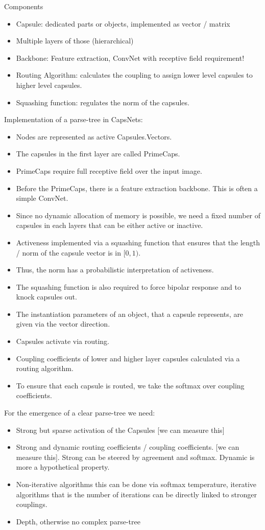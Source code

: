 \documentclass{article}
\begin{document}
Components
\begin{itemize}
	\item Capsule: dedicated parts or objects, implemented as vector / matrix
	\item Multiple layers of those (hierarchical)
	\item Backbone: Feature extraction, ConvNet with receptive field requirement!
	\item Routing Algorithm: calculates the coupling to assign lower level capsules to higher level capsules.
	\item Squashing function: regulates the norm of the capsules.
\end{itemize}

Implementation of a parse-tree in CapsNets:
\begin{itemize}
	\item Nodes are represented as active Capsules.Vectors.
	\item The capsules in the first layer are called PrimeCaps.
	\item PrimeCaps require full receptive field over the input image.
	\item Before the PrimeCaps, there is a feature extraction backbone. This is often a simple ConvNet.
	\item Since no dynamic allocation of memory is possible, we need a fixed number of capsules in each layers that can be either active or inactive.
	\item Activeness implemented via a squashing function that ensures that the length / norm of the capsule vector is in $[0,1)$.
	\item Thus, the norm has a probabilistic interpretation of activeness.
	\item The squashing function is also required to force bipolar response and to knock capsules out. 
	\item The instantiation parameters of an object, that a capsule represents, are given via the vector direction.
	\item Capsules activate via routing.
	\item Coupling coefficients of lower and higher layer capsules calculated via a routing algorithm.
	\item To ensure that each capsule is routed, we take the softmax over coupling coefficients.
\end{itemize}

For the emergence of a clear parse-tree we need:
\begin{itemize}
	\item Strong but sparse activation of the Capsules [we can measure this]
	\item Strong and dynamic routing coefficients / coupling coefficients. [we can measure this]. Strong can be steered by agreement and softmax. Dynamic is more a hypothetical property.
	\item Non-iterative algorithms this can be done via softmax temperature, iterative algorithms that is the number of iterations can be directly linked to stronger couplings.
	\item Depth, otherwise no complex parse-tree
\end{itemize}
\end{document}
